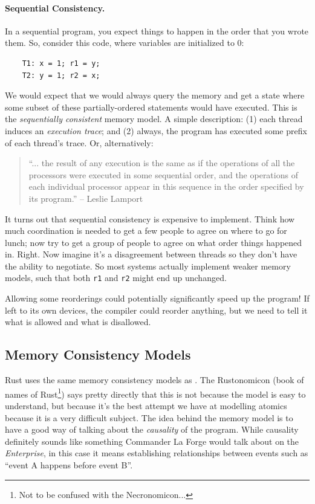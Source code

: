 \paragraph{Sequential Consistency.} In a sequential program, you expect
things to happen in the order that you wrote them. So, consider this code,
where variables are initialized to 0:

\begin{center}
\begin{lstlisting}
    T1: x = 1; r1 = y;
    T2: y = 1; r2 = x;
\end{lstlisting}
\end{center}
We would expect that we would always query the memory and get a state
where some subset of these partially-ordered statements would have executed.
This is the \emph{sequentially consistent} memory model. A simple description: (1) each thread induces an \emph{execution trace}; and (2) always, the program has executed some prefix of each thread's trace. Or, alternatively:

\begin{quote}
``... the result of any execution is the same as if the operations of all the processors were executed in some sequential order, and the operations of each individual processor appear in this sequence in the order specified by its program.'' -- Leslie Lamport
\end{quote}


It turns out that sequential consistency is expensive to implement.
Think how much coordination is needed to get a few people to agree on where to go for lunch; now try to get a group of people to agree on what order things happened in. Right. Now imagine it's a disagreement between threads so they don't have the ability to negotiate. So most systems actually implement weaker memory models, such that both {\tt r1} and {\tt r2} might end up unchanged.

Allowing some reorderings could potentially significantly speed up the program! If left to its own devices, the compiler could reorder anything, but we need to tell it what is allowed and what is disallowed. 

\subsection*{Memory Consistency Models}

Rust uses the same memory consistency models as \CPP. The Rustonomicon (book of names of Rust\footnote{Not to be confused with the Necronomicon...}) says pretty directly that this is not because the model is easy to understand, but because it's the best attempt we have at modelling atomics because it is a very difficult subject. The idea behind the memory model is to have a good way of talking about the \textit{causality} of the program. While causality definitely sounds like something Commander La Forge would talk about on the \textit{Enterprise}, in this case it means establishing relationships between events such as ``event A happens before event B''. 

